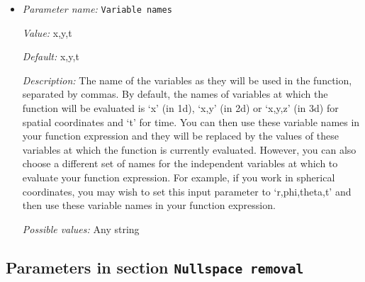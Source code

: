 \begin{itemize}
{\it Description:} The formula that denotes the function you want to evaluate for particular values of the independent variables. This expression may contain any of the usual operations such as addition or multiplication, as well as all of the common functions such as `sin' or `cos'. In addition, it may contain expressions like `if(x>0, 1, -1)' where the expression evaluates to the second argument if the first argument is true, and to the third argument otherwise. For a full overview of possible expressions accepted see the documentation of the muparser library at http://muparser.beltoforion.de/.

If the function you are describing represents a vector-valued function with multiple components, then separate the expressions for individual components by a semicolon.


{\it Possible values:} Any string
\item {\it Parameter name:} {\tt Variable names}
\label{parameters:Mesh refinement/Minimum refinement function/Variable names}


{\it Value:} x,y,t


{\it Default:} x,y,t


{\it Description:} The name of the variables as they will be used in the function, separated by commas. By default, the names of variables at which the function will be evaluated is `x' (in 1d), `x,y' (in 2d) or `x,y,z' (in 3d) for spatial coordinates and `t' for time. You can then use these variable names in your function expression and they will be replaced by the values of these variables at which the function is currently evaluated. However, you can also choose a different set of names for the independent variables at which to evaluate your function expression. For example, if you work in spherical coordinates, you may wish to set this input parameter to `r,phi,theta,t' and then use these variable names in your function expression.


{\it Possible values:} Any string
\end{itemize}

\subsection{Parameters in section \tt Nullspace removal}
\label{parameters:Nullspace_20removal}

